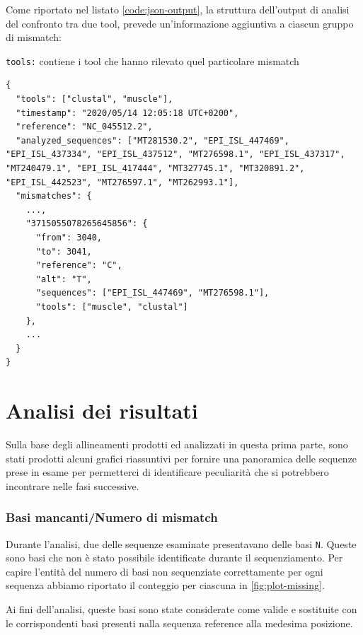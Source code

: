 \documentclass[11pt,italian]{article}
\makeatletter
\newcommand*{\lstitem}[1][]{%
  \setbox0\hbox\bgroup
    \patchcmd{\lst@InlineM}{\@empty}{\@empty\egroup\item[\usebox0]\leavevmode\ignorespaces}{}{}%
    \lstinline[#1]%
}
\makeatother
\begin{document}
\noindent
Come riportato nel listato \ref{code:json-output}, la struttura dell'output di analisi del confronto tra due tool, prevede un'informazione aggiuntiva a ciascun gruppo di mismatch:
\begin{description}
  \lstitem{tools:} contiene i tool che hanno rilevato quel particolare mismatch
\end{description}

\begin{lstlisting}[basicstyle=\small\ttfamily,caption=Esempio di output,label=code:json-output]
{
  "tools": ["clustal", "muscle"],
  "timestamp": "2020/05/14 12:05:18 UTC+0200",
  "reference": "NC_045512.2",
  "analyzed_sequences": ["MT281530.2", "EPI_ISL_447469", "EPI_ISL_437334", "EPI_ISL_437512", "MT276598.1", "EPI_ISL_437317", "MT240479.1", "EPI_ISL_417444", "MT327745.1", "MT320891.2", "EPI_ISL_442523", "MT276597.1", "MT262993.1"],
  "mismatches": {
    ...,
    "3715055078265645856": {
      "from": 3040,
      "to": 3041,
      "reference": "C",
      "alt": "T",
      "sequences": ["EPI_ISL_447469", "MT276598.1"],
      "tools": ["muscle", "clustal"]
    },
    ...
  }
}
\end{lstlisting}
\newpage

\section{Analisi dei risultati}
Sulla base degli allineamenti prodotti ed analizzati in questa prima parte, sono stati prodotti alcuni grafici riassuntivi per fornire una panoramica delle sequenze prese in esame per permetterci di identificare peculiarità che si potrebbero incontrare nelle fasi successive.

\subsubsection*{Basi mancanti/Numero di mismatch}
Durante l'analisi, due delle sequenze esaminate presentavano delle basi \lstinline{N}. Queste sono basi che non è stato possibile identificate durante il sequenziamento. Per capire l'entità del numero di basi non sequenziate correttamente per ogni sequenza abbiamo riportato il conteggio per ciascuna in \cref{fig:plot-missing}.

Ai fini dell'analisi, queste basi sono state considerate come valide e sostituite con le corrispondenti basi presenti nalla sequenza reference alla medesima posizione.
\end{document}
